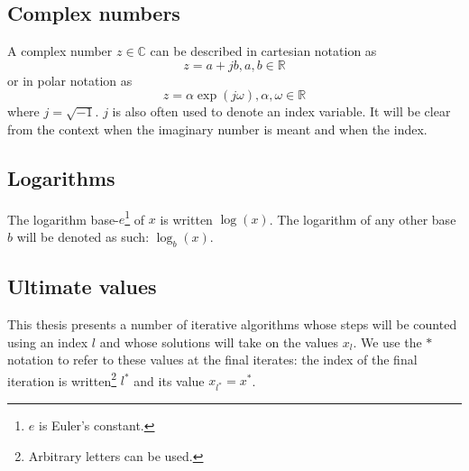 \subsection{Complex numbers}

A complex number $z \in \mathbb{C}$ can be described in cartesian notation as
\[
    z = a + jb, a,b \in \mathbb{R}
\]
or in polar notation as
\[
    z = \alpha \exp(j\omega), \alpha,\omega \in \mathbb{R}
\]
where $j = \sqrt{-1}$. $j$ is also often used to denote an index variable. It
will be clear from the context when the imaginary number is meant and when the
index.

\subsection{Logarithms}

The logarithm base-$e$\footnote{$e$ is Euler's constant.} of $x$ is written
$\log(x)$. The logarithm of any other base $b$ will be denoted as such:
$\log_{b}(x)$.

\subsection{Ultimate values}

This thesis presents a number of iterative algorithms whose steps will 
be counted using an index $l$ and whose solutions will take on the values
$x_{l}$. We use the
$\ast$ notation to refer to these values at the final iterates: the index of the
final iteration is written\footnote{Arbitrary letters can be used.} $l^{\ast}$ and its value $x_{l^{\ast}}=x^{\ast}$.

